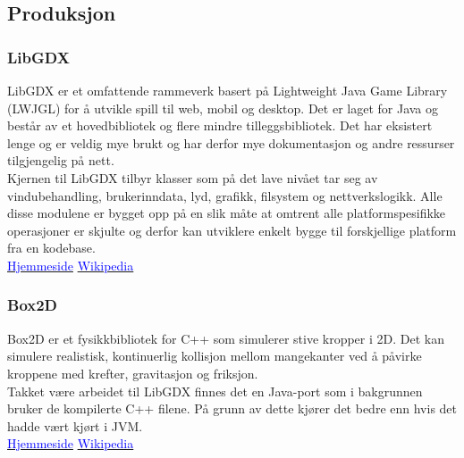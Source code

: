 \documentclass[12pt]{report}
\begin{document}
\subsection*{Produksjon}

\subsubsection*{LibGDX}

LibGDX er et omfattende rammeverk basert p{\aa} Lightweight Java Game Library (LWJGL) for {\aa} utvikle spill til web,
mobil og desktop. Det er laget for Java og best{\aa}r av et hovedbibliotek og flere mindre tilleggsbibliotek. Det har
eksistert lenge og er veldig mye brukt og har derfor mye dokumentasjon og andre ressurser tilgjengelig p{\aa} nett. \\

Kjernen til LibGDX tilbyr klasser som p{\aa} det lave niv{\aa}et tar seg av vindubehandling, brukerinndata, lyd,
grafikk, filsystem og nettverkslogikk. Alle disse modulene er bygget opp p{\aa} en slik m{\aa}te at omtrent alle
platformspesifikke operasjoner er skjulte og derfor kan utviklere enkelt bygge til forskjellige platform fra en
kodebase. \\

\href{https://libgdx.badlogicgames.com/}{\textcolor{blue}{Hjemmeside}} {\textperiodcentered}
\href{https://en.wikipedia.org/wiki/LibGDX}{\textcolor{blue}{Wikipedia}}

\subsubsection*{Box2D}

Box2D er et fysikkbibliotek for C++ som simulerer stive kropper i 2D. Det kan simulere realistisk, kontinuerlig
kollisjon mellom mangekanter ved {\aa} p{\aa}virke kroppene med krefter, gravitasjon og friksjon. \\

Takket v{\ae}re arbeidet til LibGDX finnes det en Java-port som i bakgrunnen bruker de kompilerte C++ filene. P{\aa}
grunn av dette kj{\o}rer det bedre enn hvis det hadde v{\ae}rt kj{\o}rt i JVM. \\

\href{http://box2d.org/}{\textcolor{blue}{Hjemmeside}} {\textperiodcentered}
\href{https://en.wikipedia.org/wiki/Box2D}{\textcolor{blue}{Wikipedia}}
\end{document}
